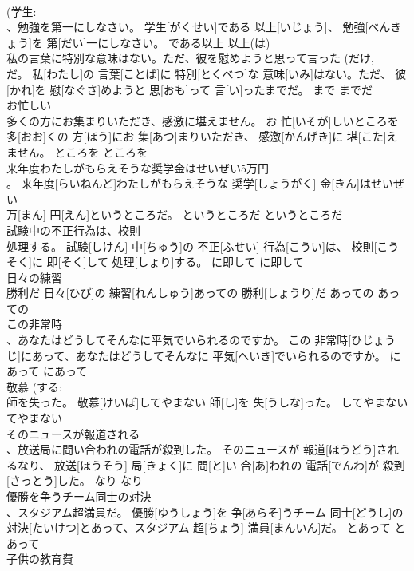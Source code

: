 \documentclass[8pt]{extreport}
\begin{document}
\begin{CJK}{UTF8}{min}
\\	(学生:
\\	、勉強を第一にしなさい。	学生[がくせい]である 以上[いじょう]、 勉強[べんきょう]を 第[だい]一にしなさい。	である以上	以上(は)	
\\	私の言葉に特別な意味はない。ただ、彼を慰めようと思って言った (だけ, 
\\	だ。	私[わたし]の 言葉[ことば]に 特別[とくべつ]な 意味[いみ]はない。ただ、 彼[かれ]を 慰[なぐさ]めようと 思[おも]って 言[い]ったまでだ。	まで	までだ	
\\	お忙しい 
\\	多くの方にお集まりいただき、感激に堪えません。	お 忙[いそが]しいところを 多[おお]くの 方[ほう]にお 集[あつ]まりいただき、 感激[かんげき]に 堪[こた]えません。	ところを	ところを	
\\	来年度わたしがもらえそうな奨学金はせいぜい5万円 
\\	。	来年度[らいねんど]わたしがもらえそうな 奨学[しょうがく] 金[きん]はせいぜい 
\\	万[まん] 円[えん]というところだ。	というところだ	というところだ	
\\	試験中の不正行為は、校則 
\\	処理する。	試験[しけん] 中[ちゅう]の 不正[ふせい] 行為[こうい]は、 校則[こうそく]に 即[そく]して 処理[しょり]する。	に即して	に即して	
\\	日々の練習 
\\	勝利だ	日々[ひび]の 練習[れんしゅう]あっての 勝利[しょうり]だ	あっての	あっての	
\\	この非常時 
\\	、あなたはどうしてそんなに平気でいられるのですか。	この 非常時[ひじょうじ]にあって、あなたはどうしてそんなに 平気[へいき]でいられるのですか。	にあって	にあって	
\\	敬慕 (する: 
\\	師を失った。	敬慕[けいぼ]してやまない 師[し]を 失[うしな]った。	してやまない	てやまない	
\\	そのニュースが報道される 
\\	、放送局に問い合われの電話が殺到した。	そのニュースが 報道[ほうどう]されるなり、 放送[ほうそう] 局[きょく]に 問[と]い 合[あ]われの 電話[でんわ]が 殺到[さっとう]した。	なり	なり	
\\	優勝を争うチーム同士の対決 
\\	、スタジアム超満員だ。	優勝[ゆうしょう]を 争[あらそ]うチーム 同士[どうし]の 対決[たいけつ]とあって、スタジアム 超[ちょう] 満員[まんいん]だ。	とあって	とあって	
\\	子供の教育費 

\end{CJK}
\end{document}
